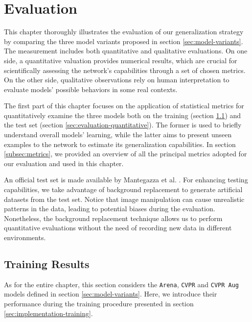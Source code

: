 \chapter{Evaluation}
\label{chap:evaluation}


This chapter thoroughly illustrates the evaluation of our generalization strategy by comparing the three model variants proposed in section \ref{sec:model-variants}. The measurement includes both quantitative and qualitative evaluations. On one side, a quantitative valuation provides numerical results, which are crucial for scientifically assessing the network's capabilities through a set of chosen metrics. On the other side, qualitative observations rely on human interpretation to evaluate models' possible behaviors in some real contexts.

The first part of this chapter focuses on the application of statistical metrics for quantitatively examine the three models both on the training (section \ref{sec:evaluation-training}) and the test set (section \ref{sec:evaluation-quantitative}). The former is used to briefly understand overall models' learning, while the latter aims to present unseen examples to the network to estimate its generalization capabilities. In section \ref{subsec:metrics}, we provided an overview of all the principal metrics adopted for our evaluation and used in this chapter.

An official test set is made available by Mantegazza et al. \cite{mantegazza2019visionbased}. For enhancing testing capabilities, we take advantage of background replacement to generate artificial datasets from the test set. Notice that image manipulation can cause unrealistic patterns in the data, leading to potential biases during the evaluation. Nonetheless, the background replacement technique allows us to perform quantitative evaluations without the need of recording new data in different environments. 






\section{Training Results}
\label{sec:evaluation-training}

As for the entire chapter, this section considers the \texttt{Arena}, \texttt{CVPR} and \texttt{CVPR Aug} models defined in section \ref{sec:model-variants}. Here, we introduce their performance during the training procedure presented in section \ref{sec:implementation-training}.


